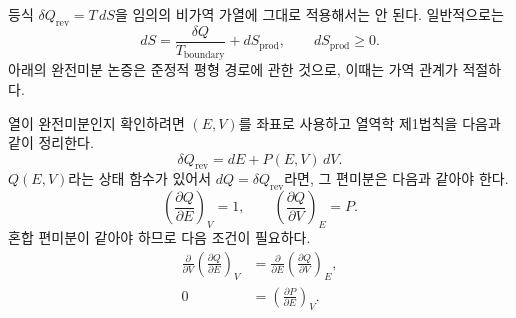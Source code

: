 등식 \(\delta Q_{\mathrm{rev}}=T\,dS\)을 임의의 비가역 가열에 그대로 적용해서는 안 된다. 일반적으로는
\begin{equation}
 dS=\frac{\delta Q}{T_{\mathrm{boundary}}}+dS_{\mathrm{prod}},
 \qquad dS_{\mathrm{prod}}\ge 0.
 \label{eq:sm6-entropy-production}
\end{equation}
아래의 완전미분 논증은 준정적 평형 경로에 관한 것으로, 이때는 가역 관계가 적절하다.

\begin{classroomqa}
\end{classroomqa}

열이 완전미분인지 확인하려면 \((E,V)\)를 좌표로 사용하고 열역학 제1법칙을 다음과 같이 정리한다.
\begin{equation}
 \delta Q_{\mathrm{rev}}=dE+P(E,V)\,dV.
 \label{eq:sm6-heat-one-form}
\end{equation}
\(Q(E,V)\)라는 상태 함수가 있어서 \(dQ=\delta Q_{\mathrm{rev}}\)라면, 그 편미분은 다음과 같아야 한다.
\begin{equation}
 \left(\frac{\partial Q}{\partial E}\right)_V=1,
 \qquad
 \left(\frac{\partial Q}{\partial V}\right)_E=P.
 \label{eq:sm6-hypothetical-heat-derivatives}
\end{equation}
혼합 편미분이 같아야 하므로 다음 조건이 필요하다.
\begin{equation}
 \begin{aligned}
 \frac{\partial}{\partial V}
 \left(\frac{\partial Q}{\partial E}\right)_V
 &=\frac{\partial}{\partial E}
 \left(\frac{\partial Q}{\partial V}\right)_E,\\
 0&=\left(\frac{\partial P}{\partial E}\right)_V.
 \end{aligned}
 \label{eq:sm6-heat-exactness-requirement}
\end{equation}

\begin{classroomqa}
\end{classroomqa}

